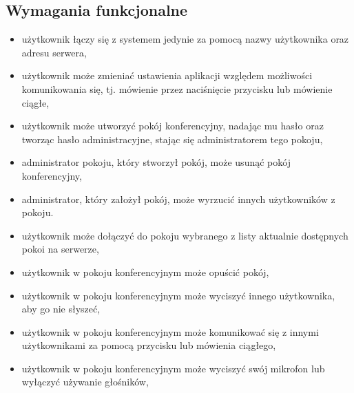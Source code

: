 \documentclass[12pt,a4paper,notitlepage]{report}
\begin{document}
	\subsection{Wymagania funkcjonalne}
	\begin{itemize}
		\item użytkownik łączy się z systemem jedynie za pomocą nazwy użytkownika oraz adresu serwera,
		\item użytkownik może zmieniać ustawienia aplikacji względem możliwości komunikowania się, tj. mówienie przez naciśnięcie przycisku lub mówienie ciągłe,
		\item użytkownik może utworzyć pokój konferencyjny, nadając mu hasło oraz tworząc hasło administracyjne, stając się administratorem tego pokoju,
		\item administrator pokoju, który stworzył pokój, może usunąć pokój konferencyjny,
		\item administrator, który założył pokój, może wyrzucić innych użytkowników z pokoju.
		\item użytkownik może dołączyć do pokoju wybranego z listy aktualnie dostępnych pokoi na serwerze,
		\item użytkownik w pokoju konferencyjnym może opuścić pokój,
		\item użytkownik w pokoju konferencyjnym może wyciszyć innego użytkownika, aby go nie słyszeć,
		\item użytkownik w pokoju konferencyjnym może komunikować się z innymi użytkownikami za pomocą przycisku lub mówienia ciągłego,
		\item użytkownik w pokoju konferencyjnym może wyciszyć swój mikrofon lub wyłączyć używanie głośników,
		
	\end{itemize}
\end{document}

